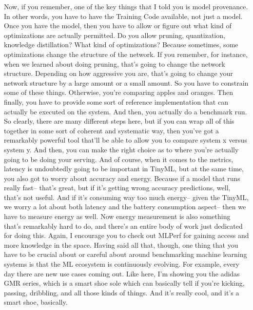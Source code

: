 {{{{{{{    Now, if you remember, one of the key things that I told you
    is model provenance.
    In other words, you have to have the Training
    Code available, not just a model.
    Once you have the model, then you have to allow or figure out
    what kind of optimizations are actually permitted.
    Do you allow pruning, quantization, knowledge distillation?
    What kind of optimizations?
    Because sometimes, some optimizations change the structure of the network.
    If you remember, for instance, when we learned about doing pruning,
    that's going to change the network structure.
    Depending on how aggressive you are, that's
    going to change your network structure by a large amount or a small amount.
    So you have to constrain some of these things.
    Otherwise, you're comparing apples and oranges.
    Then finally, you have to provide some sort of reference implementation
    that can actually be executed on the system.
    And then, you actually do a benchmark run.
    So clearly, there are many different steps here,
    but if you can wrap all of this together in some sort
    of coherent and systematic way, then you've
    got a remarkably powerful tool that'll be able to allow you to compare system
    x versus system y.
    And then, you can make the right choice as to where you're actually
    going to be doing your serving.
    And of course, when it comes to the metrics,
    latency is undoubtedly going to be important in TinyML,
    but at the same time, you also got to worry about accuracy and energy.
    Because if a model that runs really fast--
    that's great, but if it's getting wrong accuracy predictions,
    well, that's not useful.
    And if it's consuming way too much energy--
    given the TinyML, we worry a lot about both latency and the battery
    consumption aspect--
    then we have to measure energy as well.
    Now energy measurement is also something that's remarkably hard to do,
    and there's an entire body of work just dedicated for doing this.
    Again, I encourage you to check out MLPerf for gaining
    access and more knowledge in the space.
    Having said all that, though, one thing that you
    have to be crucial about or careful about around benchmarking machine
    learning systems is that the ML ecosystem is continuously evolving.
    For example, every day there are new use cases coming out.
    Like here, I'm showing you the adidas GMR series,
    which is a smart shoe sole which can basically
    tell if you're kicking, passing, dribbling,
    and all those kinds of things.
    And it's really cool, and it's a smart shoe, basically.
}}}}}}}
